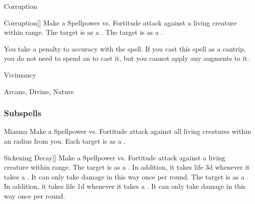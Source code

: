\newpage
\begin{spellsection}{Corruption}

\begin{spellheader}
\end{spellheader}


\begin{ability}{Corruption}[]
Make a Spellpower vs. Fortitude attack against a living creature within \rngclose range.
\hit The target is  as a .
\crit The target is  as a .
\end{ability}



You take a  penalty to accuracy with the spell.
If you cast this spell as a cantrip,
you do not need to spend an  to cast it,
but you cannot apply any augments to it.


 Vivimancy

 Arcane, Divine, Nature
\end{spellsection}


\subsubsection{Subspells}


\begin{ability}[\nth{1}]{Miasma}
Make a Spellpower vs. Fortitude attack against all living creatures within an \areamed radius from you.
\hit Each target is  as a .
\end{ability}
\vspace{0.25em}


\begin{ability}[\nth{1}]{Sickening Decay}[]
Make a Spellpower vs. Fortitude attack against a living creature within \rngclose range.
\hit The target is  as a .
In addition, it takes life  \minus3d whenever it takes a .
It can only take damage in this way once per round.
\crit The target is  as a .
In addition, it takes life  \minus1d whenever it takes a .
It can only take damage in this way once per round.
\end{ability}
\vspace{0.25em}


